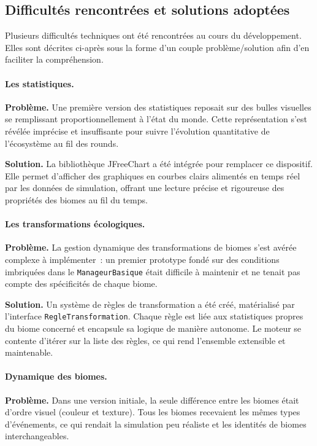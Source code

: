 \subsection{Difficultés rencontrées et solutions adoptées}
\label{subsec:difficultes}

Plusieurs difficultés techniques ont été rencontrées au cours du développement.
Elles sont décrites ci-après sous la forme d'un couple problème/solution afin
d'en faciliter la compréhension.

\paragraph{Les statistiques.}
\textbf{Problème.}
Une première version des statistiques reposait sur des bulles visuelles se
remplissant proportionnellement à l'état du monde. Cette représentation s'est
révélée imprécise et insuffisante pour suivre l'évolution quantitative de
l'écosystème au fil des rounds.

\textbf{Solution.}
La bibliothèque JFreeChart a été intégrée pour remplacer ce dispositif. Elle
permet d'afficher des graphiques en courbes clairs alimentés en temps réel par les
données de simulation, offrant une lecture précise et rigoureuse des propriétés
des biomes au fil du temps.

\paragraph{Les transformations écologiques.}
\textbf{Problème.}
La gestion dynamique des transformations de biomes s'est avérée complexe à
implémenter~: un premier prototype fondé sur des conditions imbriquées dans le
\texttt{ManageurBasique} était difficile à maintenir et ne tenait pas compte des
spécificités de chaque biome.

\textbf{Solution.}
Un système de règles de transformation a été créé, matérialisé par l'interface
\texttt{RegleTransformation}. Chaque règle est liée aux statistiques propres du
biome concerné et encapsule sa logique de manière autonome. Le moteur se contente
d'itérer sur la liste des règles, ce qui rend l'ensemble extensible et maintenable.

\paragraph{Dynamique des biomes.}
\textbf{Problème.}
Dans une version initiale, la seule différence entre les biomes était d'ordre
visuel (couleur et texture). Tous les biomes recevaient les mêmes types
d'événements, ce qui rendait la simulation peu réaliste et les identités de biomes
interchangeables.

